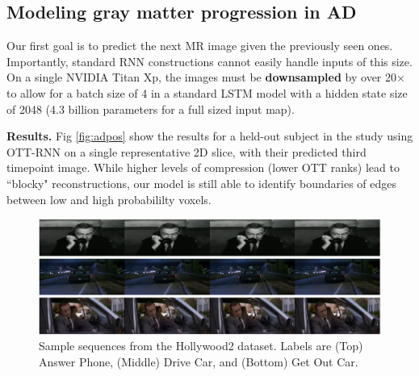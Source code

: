 \subsection{Modeling gray matter progression in AD}
Our first goal is to predict the next MR image
given the previously seen ones. Importantly, standard RNN constructions cannot easily handle inputs of this size.
On a single NVIDIA Titan Xp, the images must be {\bf downsampled} by over 20$\times$ to allow for a
batch size of 4 in a standard LSTM model with a hidden state size of 2048 (4.3 billion parameters for a full sized input map).

{\bf Results.}
Fig \ref{fig:adpos} show the results for a held-out subject in the study using OTT-RNN on a single representative 2D slice,
with their predicted third timepoint image. While higher levels of compression (lower OTT ranks) lead to ``blocky" reconstructions,
our model is still able to identify boundaries of edges between low and high probabililty voxels.

\begin{figure}[!b]
	\centering
	\includegraphics[width=0.95\columnwidth]{4_ott/figs/Hollywood2_samples.png}
	\vspace{-20pt}
	\caption{\label{fig:hollywood} \footnotesize Sample sequences from the Hollywood2 dataset. Labels are (Top) Answer Phone, (Middle) Drive Car, and (Bottom) Get Out Car.}
	
\end{figure}

